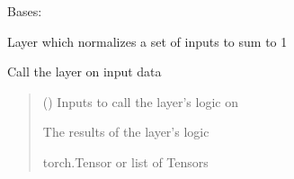 \documentclass[letterpaper,10pt,english]{sphinxmanual}
\begin{document}
\begin{fulllineitems}
\label{\detokenize{beyondml.pt.layers:beyondml.pt.layers.MultitaskNormalization.MultitaskNormalization}}
\pysigstartsignatures
{}
\pysigstopsignatures
\sphinxAtStartPar
Bases: 

\sphinxAtStartPar
Layer which normalizes a set of inputs to sum to 1

\begin{fulllineitems}
\label{\detokenize{beyondml.pt.layers:beyondml.pt.layers.MultitaskNormalization.MultitaskNormalization.forward}}
\pysigstartsignatures
{}
\pysigstopsignatures
\sphinxAtStartPar
Call the layer on input data
\begin{quote}\begin{description}
\sphinxAtStartPar
{} () \textendash{} Inputs to call the layer’s logic on

\sphinxAtStartPar
{} \textendash{} The results of the layer’s logic

\sphinxAtStartPar
torch.Tensor or list of Tensors

\end{description}\end{quote}

\end{fulllineitems}


\end{fulllineitems}
\end{document}
